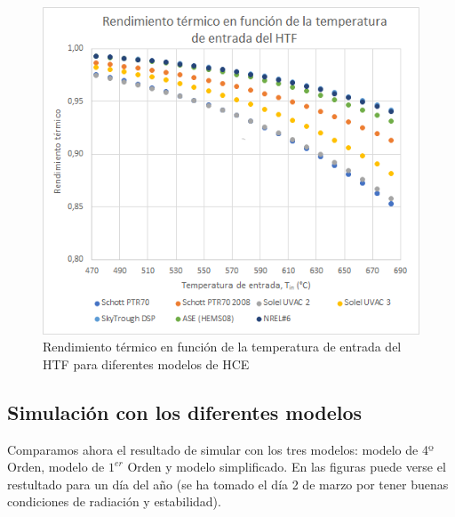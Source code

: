 \begin{figure}[!h]
\includegraphics[width=0.9\linewidth]{images/resultados_test2a.png}
\caption{Rendimiento térmico en función de la temperatura de entrada del HTF para diferentes modelos de HCE} 
\label{fig:test2a}
\end{figure}



\subsection{Simulación con los diferentes modelos}

Comparamos ahora el resultado de simular con los tres modelos: modelo de 4º Orden, modelo de $1^{er}$ Orden y modelo simplificado. En las figuras puede verse el restultado para un día del año (se ha tomado el día 2 de marzo por tener buenas condiciones de radiación y estabilidad). 

